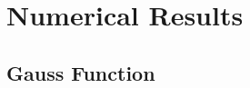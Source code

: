 \documentclass{beamer}
\newcommand{\bmx}{x}
\begin{document}
%
%


\section{Numerical Results}

\subsection{Gauss Function}

\end{document}
